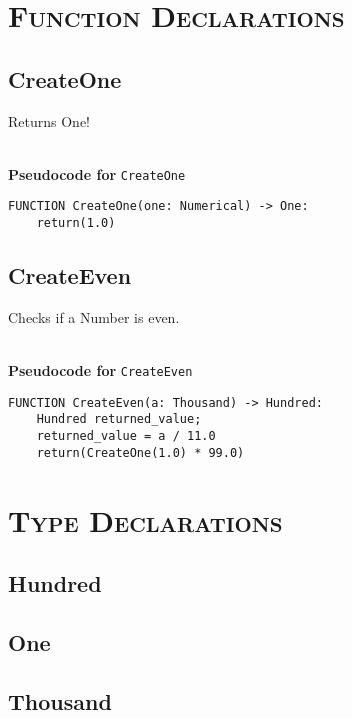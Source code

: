 
\section{\textsc{Function Declarations}}
\clearpage

\subsection{CreateOne}
Returns One!

\textbf{\\ Pseudocode for } \texttt{CreateOne}
\begin{verbatim}
FUNCTION CreateOne(one: Numerical) -> One:
	return(1.0)
\end{verbatim}

\clearpage

\subsection{CreateEven}
Checks if a Number is even.

\textbf{\\ Pseudocode for } \texttt{CreateEven}
\begin{verbatim}
FUNCTION CreateEven(a: Thousand) -> Hundred:
	Hundred returned_value;
	returned_value = a / 11.0
	return(CreateOne(1.0) * 99.0)
\end{verbatim}


\section{\textsc{Type Declarations}}

\subsection{Hundred}

\subsection{One}

\subsection{Thousand}

